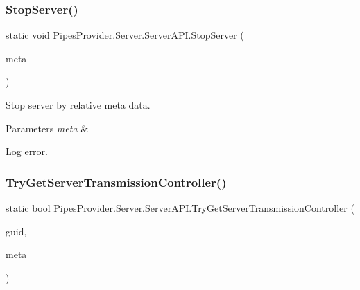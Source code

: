 \subsubsection{\texorpdfstring{Stop\+Server()}{StopServer()}\hspace{0.1cm}{\footnotesize\ttfamily [2/2]}}
{\footnotesize\ttfamily static void Pipes\+Provider.\+Server.\+Server\+A\+P\+I.\+Stop\+Server (\begin{DoxyParamCaption}\item[{\mbox{\hyperlink{class_pipes_provider_1_1_server_1_1_transmission_controllers_1_1_base_server_transmission_controller}{Base\+Server\+Transmission\+Controller}}}]{meta }\end{DoxyParamCaption})\hspace{0.3cm}{\ttfamily [static]}}



Stop server by relative meta data. 


\begin{DoxyParams}{Parameters}
{\em meta} & \\
\hline
\end{DoxyParams}
Log error. \mbox{\label{class_pipes_provider_1_1_server_1_1_server_a_p_i_a6fba1adf18ce5938c6edcb29f28adfe5}} 
\subsubsection{\texorpdfstring{Try\+Get\+Server\+Transmission\+Controller()}{TryGetServerTransmissionController()}}
{\footnotesize\ttfamily static bool Pipes\+Provider.\+Server.\+Server\+A\+P\+I.\+Try\+Get\+Server\+Transmission\+Controller (\begin{DoxyParamCaption}\item[{string}]{guid,  }\item[{out \mbox{\hyperlink{class_pipes_provider_1_1_server_1_1_transmission_controllers_1_1_base_server_transmission_controller}{Base\+Server\+Transmission\+Controller}}}]{meta }\end{DoxyParamCaption})\hspace{0.3cm}{\ttfamily [static]}}



